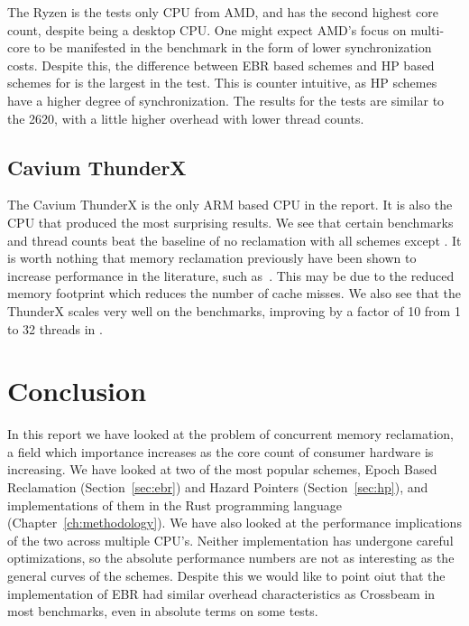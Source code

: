 \documentclass[b5paper]{report}
\begin{document}
The Ryzen is the tests only CPU from AMD, and has the second highest core count,
despite being a desktop CPU. One might expect AMD's focus on multi-core to
be manifested in the benchmark in the form of lower synchronization costs.
Despite this, the difference between EBR based schemes and HP based schemes for
 is the largest in the test. This is counter intuitive, as HP schemes
have a higher degree of synchronization. The results for the  tests
are similar to the 2620, with a little higher overhead with lower thread counts.


\clearpage
\section{Cavium ThunderX}

The Cavium ThunderX is the only ARM based CPU in the report. It is also the CPU
that produced the most surprising results. We see that certain benchmarks and
thread counts beat the baseline of no reclamation with all schemes except
. It is worth nothing that memory reclamation previously have been
shown to increase performance in the literature, such as\
\cite{brown2015reclaiming}. This may be due to the reduced memory footprint
which reduces the number of cache misses. We also see that the ThunderX scales
very well on the \code{List} benchmarks, improving by a factor of 10 from 1 to
32 threads in \code{List::Remove}.



\chapter{Conclusion\label{ch:conclusion}}

In this report we have looked at the problem of concurrent memory reclamation, a
field which importance increases as the core count of consumer hardware is
increasing. We have looked at two of the most popular schemes, Epoch Based
Reclamation (Section~\ref{sec:ebr}) and Hazard Pointers (Section~\ref{sec:hp}),
and implementations of them in the Rust programming language
(Chapter~\ref{ch:methodology}). We have also looked at the performance
implications of the two across multiple CPU's.  Neither implementation has
undergone careful optimizations, so the absolute performance numbers are not as
interesting as the general curves of the schemes. Despite this we would like to
point oiut that the implementation of EBR had similar overhead characteristics
as Crossbeam in most benchmarks, even in absolute terms on some tests.
\end{document}
